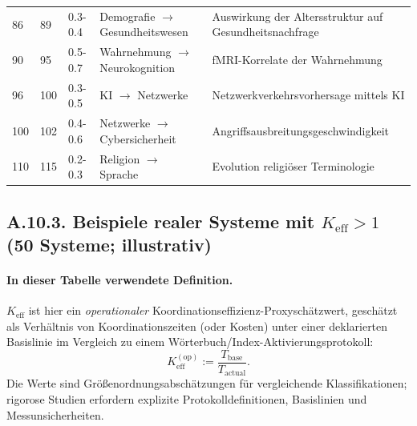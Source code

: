 \documentclass[13pt,a4paper]{article}
\newcommand{\Keff}{K_{\mathrm{eff}}}
\begin{document}
\begin{longtable}{|p{1cm}|p{1cm}|p{2.5cm}|p{4cm}|p{3cm}|}
		86 & 89 & 0.3-0.4 & Demografie $\rightarrow$ Gesundheitswesen & Auswirkung der Altersstruktur auf Gesundheitsnachfrage \\
		90 & 95 & 0.5-0.7 & Wahrnehmung $\rightarrow$ Neurokognition & fMRI-Korrelate der Wahrnehmung \\
		96 & 100 & 0.3-0.5 & KI $\rightarrow$ Netzwerke & Netzwerkverkehrsvorhersage mittels KI \\
		100 & 102 & 0.4-0.6 & Netzwerke $\rightarrow$ Cybersicherheit & Angriffsausbreitungsgeschwindigkeit \\
		110 & 115 & 0.2-0.3 & Religion $\rightarrow$ Sprache & Evolution religiöser Terminologie \\
		\hline
	\end{longtable}
	
	\subsection*{A.10.3. Beispiele realer Systeme mit $\Keff>1$ (50 Systeme; illustrativ)}
	
	
	\paragraph{In dieser Tabelle verwendete Definition.}
	$\Keff$ ist hier ein \emph{operationaler} Koordinationseffizienz-Proxyschätzwert, geschätzt als Verhältnis von Koordinationszeiten (oder Kosten) unter einer deklarierten Basislinie im Vergleich zu einem Wörterbuch/Index-Aktivierungsprotokoll:
	$$ \Keff^{(\mathrm{op})} := \frac{T_{\mathrm{base}}}{T_{\mathrm{actual}}}. $$
	Die Werte sind Größenordnungsabschätzungen für vergleichende Klassifikationen; rigorose Studien erfordern explizite Protokolldefinitionen, Basislinien und Messunsicherheiten.
	
\end{document}
